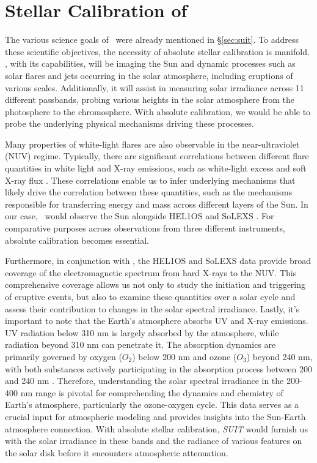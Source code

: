 \section{Stellar Calibration of  {\suit}}\label{sec:stellar_calib}

The various science goals of \suit~were already mentioned in \S\ref{sec:suit}. To address these scientific objectives, the necessity of absolute stellar calibration is manifold. \suit, with its capabilities, will be imaging the Sun and dynamic processes such as solar flares and jets occurring in the solar atmosphere, including eruptions of various scales. Additionally, it will assist in measuring solar irradiance across 11 different passbands, probing various heights in the solar atmosphere from the photosphere to the chromosphere. With absolute calibration, we would be able to probe the underlying physical mechanisms driving these processes.

Many properties of white-light flares are also observable in the near-ultraviolet (NUV) regime. Typically, there are significant correlations between different flare quantities in white light and X-ray emissions, such as white-light excess and soft X-ray flux \citep{benz16,hudson16}. These correlations enable us to infer underlying mechanisms that likely drive the correlation between these quantities, such as the mechanisms responsible for transferring energy and mass across different layers of the Sun. In our case, \suit~would observe the Sun alongside HEL1OS and SoLEXS \citep{solexs}. For comparative purposes across observations from three different instruments, absolute calibration becomes essential.

Furthermore, in conjunction with \suit, the HEL1OS and SoLEXS data provide broad coverage of the electromagnetic spectrum from hard X-rays to the NUV. This comprehensive coverage allows us not only to study the initiation and triggering of eruptive events, but also to examine these quantities over a solar cycle and assess their contribution to changes in the solar spectral irradiance. Lastly, it's important to note that the Earth's atmosphere absorbs UV and X-ray emissions. UV radiation below 310 nm is largely absorbed by the atmosphere, while radiation beyond 310 nm can penetrate it. The absorption dynamics are primarily governed by oxygen ($O_{2}$) below 200 nm and ozone ($O_{3}$) beyond 240 nm, with both substances actively participating in the absorption process between 200 and 240 nm \citep{haigh07}. Therefore, understanding the solar spectral irradiance in the 200-400 nm range is pivotal for comprehending the dynamics and chemistry of Earth's atmosphere, particularly the ozone-oxygen cycle. This data serves as a crucial input for atmospheric modeling and provides insights into the Sun-Earth atmosphere connection. With absolute stellar calibration, \textit{SUIT} would furnish us with the solar irradiance in these bands and the radiance of various features on the solar disk before it encounters atmospheric attenuation.

